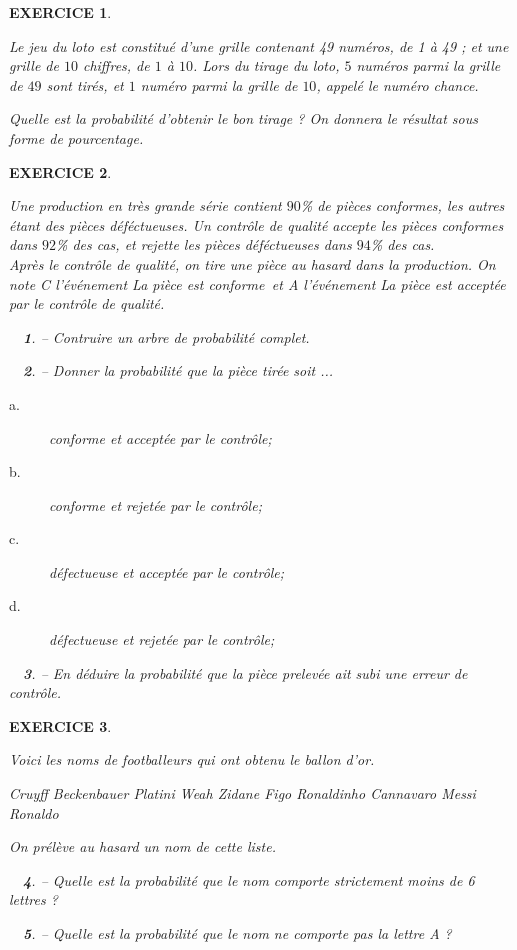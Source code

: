 \documentclass[a4paper]{article}   %
\renewcommand{\(}{\left(}
\renewcommand{\)}{\right)}
\newtheorem{ques}{~}
\newenvironment{qu}{\begin{ques}--} {\end{ques}}
\newtheorem{EXO}{\large EXERCICE }
\newenvironment{EX}   { \setcounter{ques}{0} \begin{EXO} \hrulefill ~\vspace{0.3cm}

\normalfont}    {\end{EXO} \medskip}
\begin{document}
\begin{EX}
Le jeu du loto est constitué d'une grille contenant 49 numéros, de 1 à 49 ; et une grille de $10$ chiffres, de $1$ à $10$. Lors du tirage du loto, $5$ numéros parmi la grille de $49$ sont tirés, et $1$ numéro parmi la grille de $10$, appelé le \og numéro chance\fg.

Quelle est la probabilité d'obtenir le bon tirage ? On donnera le résultat sous forme de pourcentage.
\end{EX}

\begin{EX}
Une production en très grande série contient $90$\% de pièces conformes, les autres étant des pièces déféctueuses. Un contrôle de qualité accepte les pièces conformes dans $92$\% des cas, et rejette les pièces déféctueuses dans $94$\% des cas.\\

Après le contrôle de qualité, on tire une pièce au hasard dans la production. On note C l'événement \og La pièce est conforme\fg \, et A l'événement \og La pièce est acceptée par le contrôle de qualité\fg.
\begin{qu} Contruire un arbre de probabilité complet.
\end{qu}
\begin{qu} Donner la probabilité que la pièce tirée soit ... \begin{description}
\item [a.] conforme et acceptée par le contrôle;
\item [b.] conforme et rejetée par le contrôle;
\item [c.] défectueuse  et acceptée par le contrôle;
\item [d.] défectueuse  et rejetée par le contrôle; \end{description}
\end{qu}
\begin{qu} En déduire la probabilité que la pièce prelevée ait subi une erreur de contrôle.
\end{qu}
\end{EX}

\begin{EX}

Voici les noms de footballeurs qui ont obtenu le ballon d'or. 
\begin{center} {\emph{Cruyff \quad Beckenbauer \quad Platini \quad Weah \quad Zidane \quad Figo \quad Ronaldinho \quad Cannavaro \quad Messi \quad Ronaldo}} \end{center}

On prélève au hasard un nom de cette liste.
\begin{qu} Quelle est la probabilité que le nom comporte strictement moins de 6 lettres ?
\end{qu}
\begin{qu} Quelle est la probabilité que le nom ne comporte pas la lettre A ?
\end{qu}
\end{EX}
\end{document}
